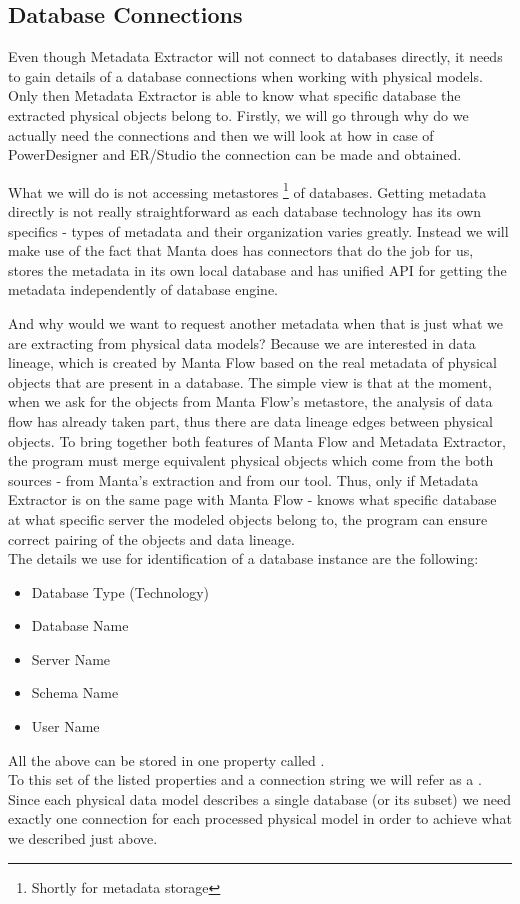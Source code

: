 \subsection{Database Connections}

Even though Metadata Extractor will not connect to databases directly, it needs to gain details of a database connections when working with physical models.
Only then Metadata Extractor is able to know what specific database the extracted physical objects belong to. Firstly, we will go through why do we actually need the connections and then we will look at how in case of PowerDesigner and ER/Studio the connection can be made and obtained.

What we will do is not accessing metastores \footnote{Shortly for metadata storage} of databases. Getting metadata directly is not really straightforward as each database technology has its own specifics - types of metadata and their organization varies greatly. 
Instead we will make use of the fact that Manta does has connectors that do the job for us, stores the metadata in its own local database and has unified API for getting the metadata independently of database engine. 

And why would we want to request another metadata when that is just what we are extracting from physical data models? \label{matching_physical_objects}
Because we are interested in data lineage, which is created by Manta Flow based on the real metadata of physical objects that are present in a database.
The simple view is that at the moment, when we ask for the objects from Manta Flow's metastore, the analysis of data flow has already taken part, thus there are data lineage edges between physical objects. To bring together both features of Manta Flow and Metadata Extractor, the program must merge equivalent physical objects which come from the both sources - from Manta's extraction and from our tool.
Thus, only if Metadata Extractor is on the same page with Manta Flow - knows what specific database at what specific server the modeled objects belong to, the program can ensure correct pairing of the objects and data lineage. \\

The details we use for identification of a database instance are the following:
\begin{itemize}
	\item Database Type (Technology)
	\item Database Name
	\item Server Name
	\item Schema Name
	\item User Name
\end{itemize} 
All the above can be stored in one property called .\\
To this set of the listed properties and a connection string we will refer as a . \\
Since each physical data model describes a single database (or its subset) we need exactly one connection for each processed physical model in order to achieve what we described just above.

